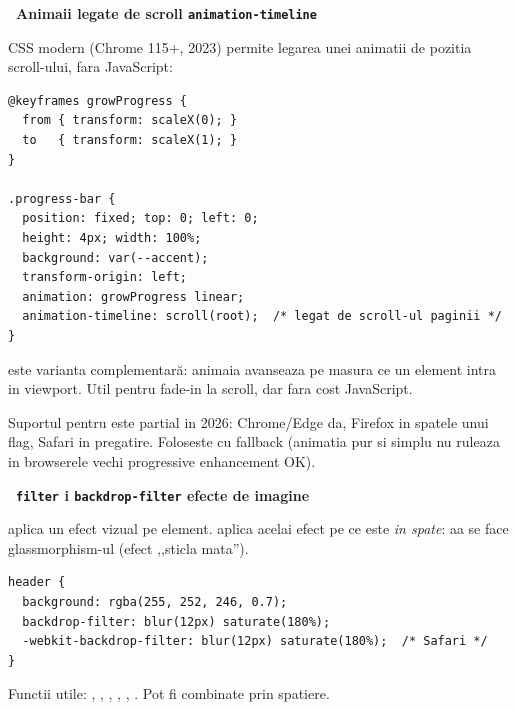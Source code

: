 \begin{bonusbox}
\medskip

\textbf{\faScroll\ Animaii legate de scroll \textendash{} \texttt{animation-timeline}}

CSS modern (Chrome 115+, 2023) permite legarea unei animatii de pozitia scroll-ului, fara JavaScript:

\begin{lstlisting}[style=css, caption={Bara de progres care urmare\textcommabelow{s}te scroll-ul}]
@keyframes growProgress {
  from { transform: scaleX(0); }
  to   { transform: scaleX(1); }
}

.progress-bar {
  position: fixed; top: 0; left: 0;
  height: 4px; width: 100%;
  background: var(--accent);
  transform-origin: left;
  animation: growProgress linear;
  animation-timeline: scroll(root);  /* legat de scroll-ul paginii */
}
\end{lstlisting}

 este varianta complementar\u a: animaia avanseaza pe masura ce un element intra in viewport. Util pentru fade-in la scroll, dar fara cost JavaScript.

\begin{nota}
Suportul pentru  este partial in 2026: Chrome/Edge da, Firefox in spatele unui flag, Safari in pregatire. Foloseste cu fallback (animatia pur si simplu nu ruleaza in browserele vechi \textendash{} progressive enhancement OK).
\end{nota}

\medskip

\textbf{\faMagic\ \texttt{filter} i \texttt{backdrop-filter} \textendash{} efecte de imagine}

 aplica un efect vizual pe element.  aplica acelai efect pe ce este \emph{in spate}: aa se face glassmorphism-ul (efect ,,sticla mata'').

\begin{lstlisting}[style=css, caption={Header transparent cu blur pe continutul dedesubt}]
header {
  background: rgba(255, 252, 246, 0.7);
  backdrop-filter: blur(12px) saturate(180%);
  -webkit-backdrop-filter: blur(12px) saturate(180%);  /* Safari */
}
\end{lstlisting}

Functii utile: , , , , , . Pot fi combinate prin spatiere.


\end{bonusbox}

